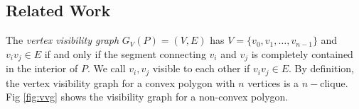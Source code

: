 \documentclass[]{styles/svproc}  %
\begin{document}
%    




\subsection{Related Work}


The \textit{vertex visibility graph} $G_V(P) = (V, E)$ has $V = \{v_0, v_1, \ldots, v_{n-1}\}$ and $v_iv_j\in E$ if and only if the segment connecting $v_i$ and $v_j$ is completely contained in the interior of $P$. We call $v_i, v_j$ visible to each other if $v_iv_j\in E$. By definition, the vertex visibility graph for a convex polygon with $n$ vertices is a $n-$clique. Fig
\ref{fig:vvg} shows the visibility graph for a non-convex polygon.
\end{document}
